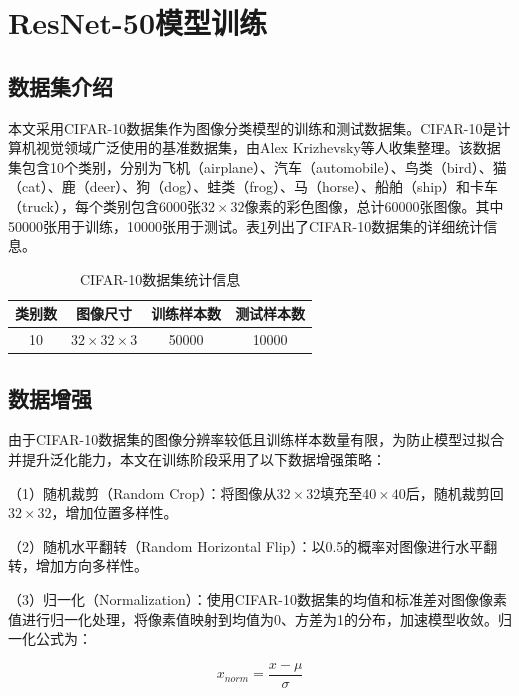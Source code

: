 \section{ResNet-50模型训练}

\subsection{数据集介绍}

本文采用CIFAR-10数据集作为图像分类模型的训练和测试数据集。CIFAR-10是计算机视觉领域广泛使用的基准数据集\cite{krizhevsky2012imagenet}，由Alex Krizhevsky等人收集整理。该数据集包含10个类别，分别为飞机（airplane）、汽车（automobile）、鸟类（bird）、猫（cat）、鹿（deer）、狗（dog）、蛙类（frog）、马（horse）、船舶（ship）和卡车（truck），每个类别包含6000张$32\times32$像素的彩色图像，总计60000张图像。其中50000张用于训练，10000张用于测试。表\ref{tab:cifar10}列出了CIFAR-10数据集的详细统计信息。

\begin{table}[htbp]
	\centering
	\caption{CIFAR-10数据集统计信息}
	\label{tab:cifar10}
	\begin{tabular}{cccc}
		\toprule
		类别数 & 图像尺寸 & 训练样本数 & 测试样本数 \\
		\midrule
		10 & $32\times32\times3$ & 50000 & 10000 \\
		\bottomrule
	\end{tabular}
\end{table}

\subsection{数据增强}

由于CIFAR-10数据集的图像分辨率较低且训练样本数量有限，为防止模型过拟合并提升泛化能力，本文在训练阶段采用了以下数据增强策略：

（1）随机裁剪（Random Crop）：将图像从$32\times32$填充至$40\times40$后，随机裁剪回$32\times32$，增加位置多样性。

（2）随机水平翻转（Random Horizontal Flip）：以0.5的概率对图像进行水平翻转，增加方向多样性。

（3）归一化（Normalization）：使用CIFAR-10数据集的均值和标准差对图像像素值进行归一化处理，将像素值映射到均值为0、方差为1的分布，加速模型收敛。归一化公式为：

\begin{equation}
	x_{norm} = \frac{x - \mu}{\sigma}
	\label{eq:normalize}
\end{equation}

